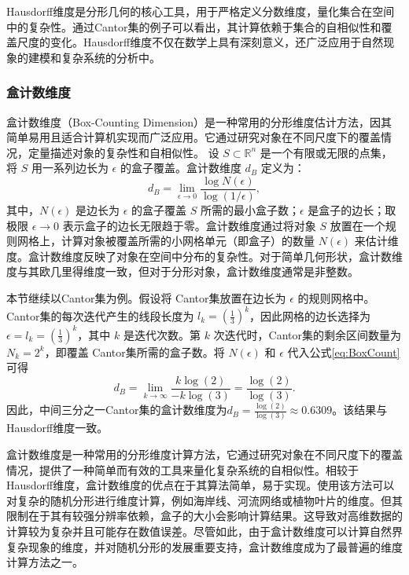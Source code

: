 Hausdorff维度是分形几何的核心工具，用于严格定义分数维度，量化集合在空间中的复杂性。通过Cantor集的例子可以看出，其计算依赖于集合的自相似性和覆盖尺度的变化。Hausdorff维度不仅在数学上具有深刻意义，还广泛应用于自然现象的建模和复杂系统的分析中。

\subsubsection{盒计数维度}
盒计数维度（Box-Counting Dimension）是一种常用的分形维度估计方法，因其简单易用且适合计算机实现而广泛应用。它通过研究对象在不同尺度下的覆盖情况，定量描述对象的复杂性和自相似性。
设 $S \subset \mathbb{R}^n$ 是一个有限或无限的点集，将 $S$ 用一系列边长为 $\epsilon$ 的盒子覆盖。盒计数维度 $d_B$ 定义为：
\begin{equation}
d_B = \lim_{\epsilon \to 0} \frac{\log N(\epsilon)}{\log(1/\epsilon)},
\label{eq:BoxCount}
\end{equation}
其中，$N(\epsilon)$ 是边长为 $\epsilon$ 的盒子覆盖 $S$ 所需的最小盒子数；$\epsilon$ 是盒子的边长；取极限 $\epsilon \to 0$ 表示盒子的边长无限趋于零。盒计数维度通过将对象 $S$ 放置在一个规则网格上，计算对象被覆盖所需的小网格单元（即盒子）的数量 $N(\epsilon)$ 来估计维度。盒计数维度反映了对象在空间中分布的复杂性。对于简单几何形状，盒计数维度与其欧几里得维度一致，但对于分形对象，盒计数维度通常是非整数。

本节继续以Cantor集为例。假设将 Cantor集放置在边长为 $\epsilon$ 的规则网格中。Cantor集的每次迭代产生的线段长度为 $l_k = \left(\frac{1}{3}\right)^k$，因此网格的边长选择为 $\epsilon = l_k = \left(\frac{1}{3}\right)^k$，其中 $k$ 是迭代次数。第 $k$ 次迭代时，Cantor集的剩余区间数量为 $N_k = 2^k$，即覆盖 Cantor集所需的盒子数。将 $N(\epsilon)$ 和 $\epsilon$ 代入公式\ref{eq:BoxCount}可得
\begin{equation}
d_B = \lim_{k \to \infty} \frac{k \log(2)}{-k \log(3)} = \frac{\log(2)}{\log(3)}.
\end{equation}
因此，中间三分之一Cantor集的盒计数维度为$d_B = \frac{\log(2)}{\log(3)} \approx 0.6309$。该结果与Hausdorff维度一致。

盒计数维度是一种常用的分形维度计算方法，它通过研究对象在不同尺度下的覆盖情况，提供了一种简单而有效的工具来量化复杂系统的自相似性。相较于Hausdorff维度，盒计数维度的优点在于其算法简单，易于实现。使用该方法可以对复杂的随机分形进行维度计算，例如海岸线、河流网络或植物叶片的维度\cite{Mandelbrot1982}。但其限制在于其有较强分辨率依赖，盒子的大小会影响计算结果。这导致对高维数据的计算较为复杂并且可能存在数值误差。尽管如此，由于盒计数维度可以计算自然界复杂现象的维度，并对随机分形的发展重要支持，盒计数维度成为了最普遍的维度计算方法之一。
